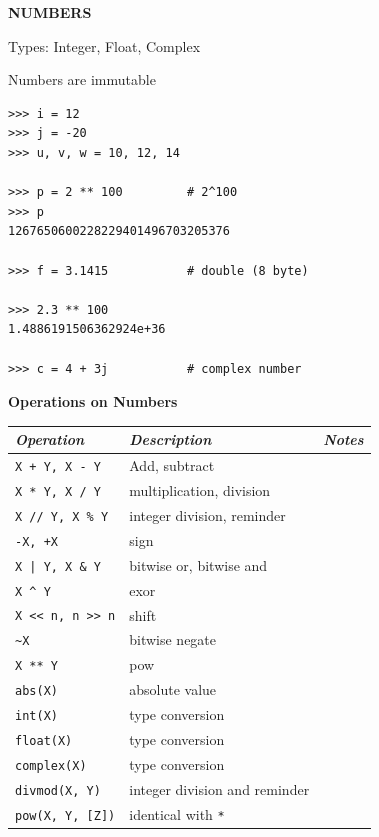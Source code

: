 \documentclass[9pt,a4wide]{extarticle}
\begin{document}


\bigskip
{\LARGE\bf NUMBERS}
{}

Types: Integer, Float, Complex

Numbers are immutable

\begin{verbatim}
>>> i = 12
>>> j = -20
>>> u, v, w = 10, 12, 14

>>> p = 2 ** 100         # 2^100
>>> p
1267650600228229401496703205376

>>> f = 3.1415           # double (8 byte)

>>> 2.3 ** 100
1.4886191506362924e+36

>>> c = 4 + 3j           # complex number
\end{verbatim}



\medskip
{\bf Operations on Numbers}
{}

\medskip

\begin{supertabular}{|l|p{12cm}|c|}\hline
{\em Operation}      & {\em Description}        &  {\em Notes} \\ \hline\hline

{\tt X + Y, X - Y}   & Add, subtract            &        \\ \hline
{\tt X * Y, X / Y}   & multiplication, division  &        \\ \hline
{\tt X // Y, X \% Y} & integer division, reminder  &        \\ \hline
{\tt -X, +X}         & sign                         &        \\ \hline
{\tt X | Y, X \& Y}   & bitwise or, bitwise and   &        \\ \hline
{\tt X \^{} Y}        &  exor                        &        \\ \hline
{\tt X << n, n >> n} &  shift                        &        \\ \hline
{\tt \~{}X}             & bitwise negate                      &        \\ \hline
{\tt X ** Y}         &  pow                        &        \\ \hline
{\tt abs(X)}         &  absolute value                        &        \\ \hline
{\tt int(X)}         &  type conversion                        &        \\ \hline
{\tt float(X)}         &  type conversion                        &        \\ \hline
{\tt complex(X)}         & type conversion        &        \\ \hline
{\tt divmod(X, Y)}       & integer division and reminder   &        \\ \hline
{\tt pow(X, Y, [Z])}     & identical with {\tt **}  &        \\ \hline
\end{supertabular}
\end{document}
